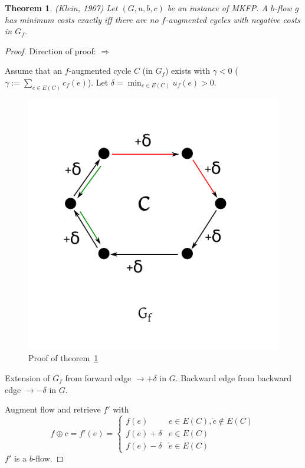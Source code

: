 \documentclass{article}
\newtheorem{theorem}{Theorem}
\begin{document}
\begin{theorem}\label{satz-5.3}
  (Klein, 1967)
  Let $(G, u, b, c)$ be an instance of MKFP. A $b$-flow $g$ has minimum costs exactly iff there are no $f$-augmented cycles with negative costs in $G_f$.
\end{theorem}

\begin{proof}
  Direction of proof: $\Rightarrow$

  Assume that an $f$-augmented cycle $C$ (in $G_f$) exists with $\gamma < 0$ ($\gamma := \sum_{e \in E(C)} c_f(e)$). Let $\delta = \min_{e \in E(C)} u_f(e) > 0$.

  \begin{figure}[ht]
   \begin{center}
    \includegraphics{img/satz_5_3.pdf}
    \caption{Proof of theorem~\ref{satz-5.3}}
   \end{center}
  \end{figure}

  Extension of $G_f$ from forward edge $\rightarrow +\delta$ in $G$. Backward edge from backward edge $\rightarrow -\delta$ in $G$.

  Augment flow and retrieve $f'$ with
  \[
    f \oplus c = f'(e) = \begin{cases}
      f(e)      & e \in E(C), \overleftarrow{e} \notin E(C) \\
      f(e) + \delta    & e \in E(C) \\
      f(e) - \delta    & \overleftarrow{e} \in E(C)
    \end{cases}
  \]
  $f'$ is a $b$-flow.


\end{proof}
\end{document}
